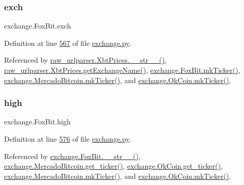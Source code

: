 \mbox{\label{classexchange_1_1_fox_bit_a3922433dcfe54e39c3c0da12fa252658}} 
\subsubsection{\texorpdfstring{exch}{exch}}
{\footnotesize\ttfamily exchange.\+Fox\+Bit.\+exch}



Definition at line \hyperlink{exchange_8py_source_l00567}{567} of file \hyperlink{exchange_8py_source}{exchange.\+py}.



Referenced by \hyperlink{raw__urlparser_8py_source_l00074}{raw\+\_\+urlparser.\+Xbt\+Prices.\+\_\+\+\_\+str\+\_\+\+\_\+()}, \hyperlink{raw__urlparser_8py_source_l00068}{raw\+\_\+urlparser.\+Xbt\+Prices.\+get\+Exchange\+Name()}, \hyperlink{exchange_8py_source_l00584}{exchange.\+Fox\+Bit.\+mk\+Ticker()}, \hyperlink{exchange_8py_source_l00665}{exchange.\+Mercado\+Bitcoin.\+mk\+Ticker()}, and \hyperlink{exchange_8py_source_l00730}{exchange.\+Ok\+Coin.\+mk\+Ticker()}.

\mbox{\label{classexchange_1_1_fox_bit_a4f6dfaecbcc17ceadddf52d266d9c00d}} 
\subsubsection{\texorpdfstring{high}{high}}
{\footnotesize\ttfamily exchange.\+Fox\+Bit.\+high}



Definition at line \hyperlink{exchange_8py_source_l00576}{576} of file \hyperlink{exchange_8py_source}{exchange.\+py}.



Referenced by \hyperlink{exchange_8py_source_l00610}{exchange.\+Fox\+Bit.\+\_\+\+\_\+str\+\_\+\+\_\+()}, \hyperlink{exchange_8py_source_l00651}{exchange.\+Mercado\+Bitcoin.\+get\+\_\+ticker()}, \hyperlink{exchange_8py_source_l00716}{exchange.\+Ok\+Coin.\+get\+\_\+ticker()}, \hyperlink{exchange_8py_source_l00665}{exchange.\+Mercado\+Bitcoin.\+mk\+Ticker()}, and \hyperlink{exchange_8py_source_l00730}{exchange.\+Ok\+Coin.\+mk\+Ticker()}.

